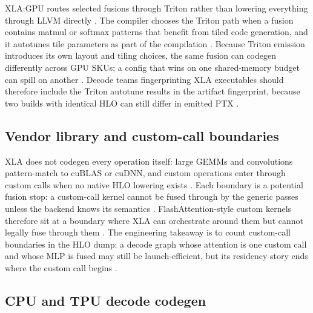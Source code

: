 XLA:GPU routes selected fusions through Triton rather than lowering everything through LLVM directly \citep{openxla2024,tillet2019triton}. The compiler chooses the Triton path when a fusion contains matmul or softmax patterns that benefit from tiled code generation, and it autotunes tile parameters as part of the compilation \citep{openxla2024,patel2025llminference}. Because Triton emission introduces its own layout and tiling choices, the same fusion can codegen differently across GPU SKUs; a config that wins on one shared-memory budget can spill on another \citep{nvidia2022hopper,memoryfloor2026}. Decode teams fingerprinting XLA executables should therefore include the Triton autotune results in the artifact fingerprint, because two builds with identical HLO can still differ in emitted PTX \citep{yirage2026,chen2020compilerbasedhardw}.

\subsection{Vendor library and custom-call boundaries}

XLA does not codegen every operation itself: large GEMMs and convolutions pattern-match to cuBLAS or cuDNN, and custom operations enter through custom calls when no native HLO lowering exists \citep{openxla2024}. Each boundary is a potential fusion stop: a custom-call kernel cannot be fused through by the generic passes unless the backend knows its semantics \citep{chen2020compilerbasedhardw,patel2025llminference}. FlashAttention-style custom kernels therefore sit at a boundary where XLA can orchestrate around them but cannot legally fuse through them \citep{dao2022flashattention,openxla2024}. The engineering takeaway is to count custom-call boundaries in the HLO dump: a decode graph whose attention is one custom call and whose MLP is fused may still be launch-efficient, but its residency story ends where the custom call begins \citep{taxbreak2026,memoryfloor2026}.

\subsection{CPU and TPU decode codegen}

